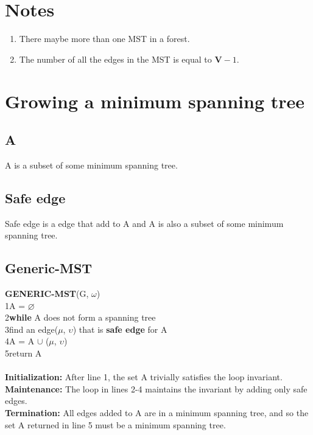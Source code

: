 \section {Notes}

\begin{enumerate}[label=(\roman*)]
\item There maybe more than one MST in a forest.
\item The number of all the edges in the MST is equal to $\boldsymbol{V} - 1$.
\end{enumerate}

\section {Growing a minimum spanning tree}

\subsection {A}
A is a subset of some minimum spanning tree.

\subsection {Safe edge}
Safe edge is a edge that add to A and A is also a subset of some minimum
spanning tree.

\subsection {Generic-MST}

\textbf{GENERIC-MST}(G, $\omega$)\\
1\space A = $\varnothing$\\
2\space \textbf{while} A does not form a spanning tree\\
3\space\space\space\space find an edge($\mu$, $\upsilon$) that is
\textbf{safe edge} for A\\
4\space\space\space\space A = A $\cup$ {($\mu$, $\upsilon$)}\\
5\space return A\\
\\
\textbf{Initialization:} After line 1, the set A trivially satisfies the loop
invariant.\\
\textbf{Maintenance:} The loop in lines 2-4 maintains the invariant by adding
only safe edges.\\
\textbf{Termination:} All edges added to A are in a minimum spanning tree, and
so the set A returned in line 5 must be a minimum spanning tree.

